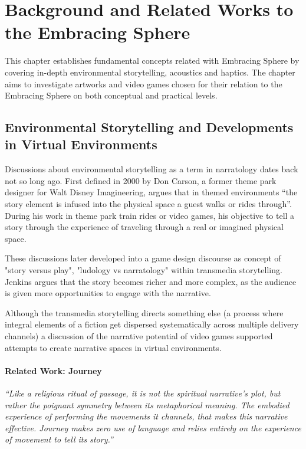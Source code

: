 \chapter{Background and Related Works to the Embracing Sphere}
    This chapter establishes fundamental concepts related with Embracing Sphere by covering in-depth environmental storytelling, acoustics and haptics. The chapter aims to investigate artworks and video games chosen for their relation to the Embracing Sphere on both conceptual and practical levels.\par
    \section{Environmental Storytelling and Developments in Virtual Environments}
        Discussions about environmental storytelling as a term in narratology dates back not so long ago. First defined in 2000 by Don Carson, a former theme park designer for Walt Disney Imagineering, argues that in themed environments “the story element is infused into the physical space a guest walks or rides through”\cite{Liminal_Space_Between_Embedded_and_Emergent_Narrative}. During his work in theme park train rides or video games, his objective to tell a story through the experience of traveling through a real or imagined physical space\cite{Lessons_Learned_from_the_Theme_Park_Industry}.\par

        These discussions later developed into a game design discourse as concept of "story versus play", "ludology vs narratology\cite{Hamlet_on_the_Holodeck}" within transmedia storytelling\cite{Jenkins_Shall_We_Play}. Jenkins argues that the story becomes richer and more complex, as the audience is given more opportunities to engage with the narrative.\par

        Although the transmedia storytelling directs something else (a process where integral elements of a fiction get dispersed systematically across multiple delivery channels\cite{Jenkins_Transmedia}) a discussion of the narrative potential of video games supported attempts to create narrative spaces in virtual environments\cite{Liminal_Space_Between_Embedded_and_Emergent_Narrative}.\par

        \subsubsection{Related Work: Journey}
            \emph{“Like a religious ritual of passage, it is not the spiritual narrative’s plot, but rather the poignant symmetry between its metaphorical meaning. The embodied experience of performing the movements it channels, that makes this narrative effective. Journey makes zero use of language and relies entirely on the experience of movement to tell its story\cite{Game_Movement_as_Enactive_Focalization}\cite{Narrative_Geography}.”}\par

